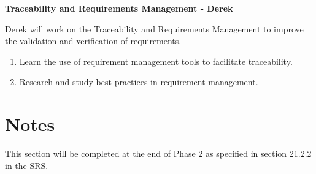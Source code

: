 \documentclass[12pt, titlepage]{article}
\begin{document}
\begin{enumerate}
	\textbf{Traceability and Requirements Management - Derek} 

	Derek will work on the Traceability and Requirements Management to improve the 
	validation and verification of requirements.
	\begin{enumerate}
		\item Learn the use of requirement management tools to facilitate traceability.
		\item Research and study best practices in requirement management.
	\end{enumerate}
	  
\end{enumerate}


\section*{Notes}
This section will be completed at the end of Phase 2 as specified in section 21.2.2 in the SRS.
\end{document}
